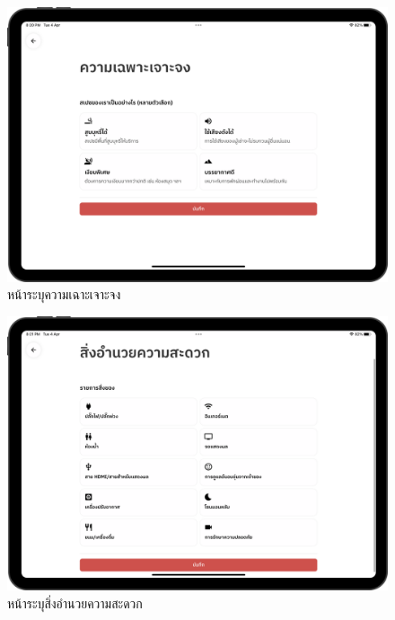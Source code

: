 \begin{figure}[ht]
    \begin{center}
    \includegraphics[width=5.5in]{./image/Flowider_place_Specification.png}
    \end{center}
    \caption[Flowider place Specification]{หน้าระบุความเฉาะเจาะจง}
    \label{fig:Flowider_place_Specification}
\end{figure}
\begin{figure}[ht]
    \begin{center}
    \includegraphics[width=5.5in]{./image/Flowider_place_amenity.png}
    \end{center}
    \caption[Flowider place amenity]{หน้าระบุสิ่งอำนวยความสะดวก}
    \label{fig:Flowider_place_amenity}
\end{figure}
